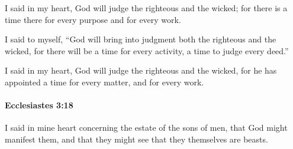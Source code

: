 			\begin{versebox}
					\item[BHS] 
					\item[LXX] 
					\item[ASV] I said in my heart, God will judge the righteous and the wicked; for there is a time there for every purpose and for every work.
					\item[NIV] I said to myself, “God will bring into judgment both the righteous and the wicked, for there will be a time for every activity, a time to judge every deed.”
					\item[NRSV] I said in my heart, God will judge the righteous and the wicked, for he has appointed a time for every matter, and for every work.
			\end{versebox}

		\paragraph{Ecclesiastes 3:18} %
			\label{ECCLESIASTES-3-18}

			I said in mine heart concerning the estate of the sons of men, that God might manifest them, and that they might see that they themselves are beasts.

